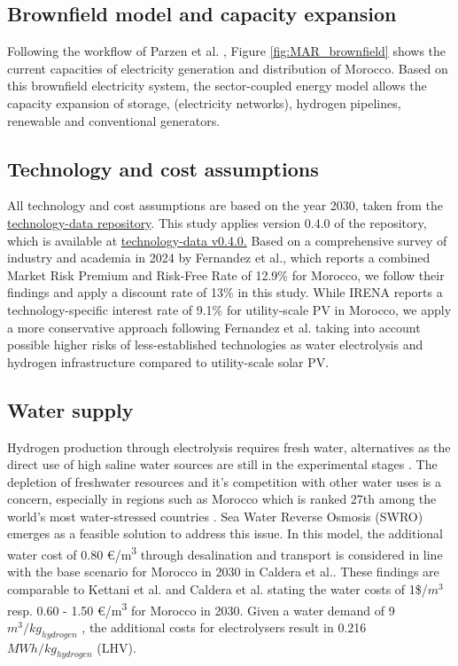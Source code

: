 \documentclass[5p,numafflabel]{elsarticle}
\begin{document}
\subsection*{Brownfield model and capacity expansion}
\label{brownfield_model}
Following the workflow of Parzen et al. \cite{Parzen2023}, Figure \ref{fig:MAR_brownfield} shows the current capacities of electricity generation and distribution of Morocco. Based on this brownfield electricity system, the sector-coupled energy model allows the capacity expansion of storage, (electricity networks), hydrogen pipelines, renewable and conventional generators.

\subsection*{Technology and cost assumptions}
\label{subsec:tech_assump}
All technology and cost assumptions are based on the year 2030, taken from the \href{https://github.com/pypsa/technology-data}{technology-data repository}. This study applies version 0.4.0 of the repository, which is available at \href{https://github.com/PyPSA/technology-data/blob/v0.4.0/outputs/costs_2030.csv}{technology-data v0.4.0.}
Based on a comprehensive survey of industry and academia in 2024 by Fernandez et al.\cite{Fernandez2024}, which reports a combined Market Risk Premium and Risk-Free Rate of 12.9\% for Morocco, we follow their findings and apply a discount rate of 13\% in this study. While IRENA\cite{IRENA2023} reports a technology-specific interest rate of 9.1\% for utility-scale PV in Morocco, we apply a more conservative approach following Fernandez et al.\cite{Fernandez2024} taking into account possible higher risks of less-established technologies as water electrolysis and hydrogen infrastructure compared to utility-scale solar PV.



\subsection*{Water supply}
\label{subsec:water_supply}
Hydrogen production through electrolysis requires fresh water, alternatives as the direct use of high saline water sources are still in the experimental stages \cite{Tong2020}. The depletion of freshwater resources and it's competition with other water uses is a concern, especially in regions such as Morocco which is ranked 27th among the world's most water-stressed countries \cite{Maddocks2015}. 
Sea Water Reverse Osmosis (SWRO) emerges as a feasible solution to address this issue. In this model, the additional water cost of 0.80 €/\si{\cubic\metre} through desalination and transport is considered in line with the base scenario for Morocco in 2030 in Caldera et al.\cite{Caldera2020}. These findings are comparable to Kettani et al.\cite{Kettani2020} and Caldera et al.\cite{Caldera2016} stating the water costs of 1\$/$m^3$ resp. 0.60 - 1.50 €/\si{\cubic\metre} for Morocco in 2030. Given a water demand of 9~$m^3/kg_{hydrogen}$
\cite{Hampp2023}, the additional costs for electrolysers result in 0.216~$MWh/kg_{hydrogen}$ (LHV).
\end{document}
